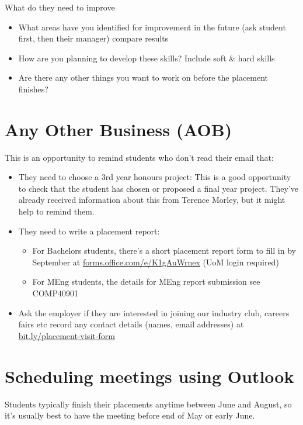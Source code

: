 \documentclass[
]{book}
\providecommand{\tightlist}{%
  \setlength{\itemsep}{0pt}\setlength{\parskip}{0pt}}
\begin{document}
What do they need to improve

\begin{itemize}
\tightlist
\item
  What areas have you identified for improvement in the future (ask student first, then their manager) compare results
\item
  How are you planning to develop these skills? Include soft \& hard skills
\item
  Are there any other things you want to work on before the placement finishes?
\end{itemize}

\section{Any Other Business (AOB)}\label{aob}

This is an opportunity to remind students who don't read their email that:

\begin{itemize}
\tightlist
\item
  They need to choose a 3rd year honours project: This is a good opportunity to check that the student has chosen or proposed a final year project. They've already received information about this from Terence Morley, but it might help to remind them.
\item
  They need to write a placement report:

  \begin{itemize}
  \tightlist
  \item
    For Bachelors students, there's a short placement report form to fill in by September at \href{https://forms.office.com/e/K1gAuWrnex}{forms.office.com/e/K1gAuWrnex} (UoM login required)
  \item
    For MEng students, the details for MEng report submission see COMP40901
  \end{itemize}
\item
  Ask the employer if they are interested in joining our industry club, careers fairs etc record any contact details (names, email addresses) at \url{bit.ly/placement-visit-form}
\end{itemize}

\section{Scheduling meetings using Outlook}\label{schedule}

Students typically finish their placements anytime between June and August, so it's usually best to have the meeting before end of May or early June.
\end{document}
